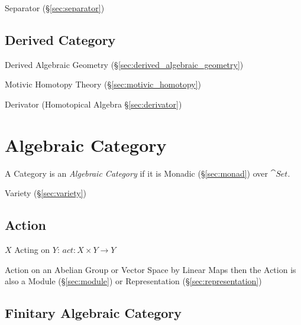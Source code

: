 Separator (\S\ref{sec:separator})



\subsection{Derived Category}\label{sec:derived_category}

Derived Algebraic Geometry (\S\ref{sec:derived_algebraic_geometry})

Motivic Homotopy Theory (\S\ref{sec:motivic_homotopy})

Derivator (Homotopical Algebra \S\ref{sec:derivator})



\section{Algebraic Category}\label{sec:algebraic_category}

A Category is an \emph{Algebraic Category} if it is Monadic (\S\ref{sec:monad})
over $\cat{Set}$.

Variety (\S\ref{sec:variety})



\subsection{Action}\label{sec:action}


$X$ Acting on $Y$: $act: X \times Y \rightarrow Y$

Action on an Abelian Group or Vector Space by Linear Maps then the
Action is also a Module (\S\ref{sec:module}) or Representation
(\S\ref{sec:representation})



\subsection{Finitary Algebraic Category}
\label{sec:finitary_algebraic_category}

